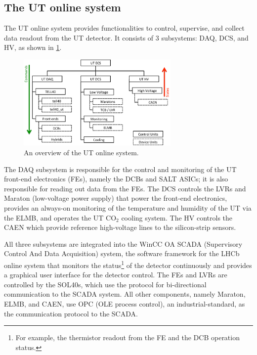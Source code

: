 \subsection{The UT online system}
\label{online-ut}


The UT online system provides functionalities to control, supervise,
and collect data readout from the UT detector.
It consists of 3 subsystems: DAQ, DCS, and HV, as shown in
\cref{fig:ut-online-system}.

\begin{figure}[!htb]
    \centering
    \includegraphics[width=0.7\textwidth]{figs-ut-upgrade/online/ut_online_sys.pdf}
    \caption{
        An overview of the UT online system.
    }
    \label{fig:ut-online-system}
\end{figure}

The DAQ subsystem is responsible for the control and monitoring of the UT
front-end electronics (FEs),
namely the DCBs and SALT ASICs;
it is also responsible for reading out data from the FEs.
The DCS controls the LVRs and Maraton (low-voltage power supply) that power the
front-end electronics,
provides an always-on monitoring of the temperature and humidity of the UT via
the ELMB,
and operates the UT $\text{CO}_2$ cooling system.
The HV controls the CAEN which provide reference high-voltage lines to the
silicon-strip sensors.

All three subsystems are integrated into the WinCC OA SCADA
(Supervisory Control And Data Acquisition) system,
the software framework for the LHCb online system that monitors the
status\footnote{
    For example, the thermistor readout from the FE and the DCB operation
    status.
} of the detector continuously and provides a graphical user interface for the
detector control.
The FEs and LVRs are controlled by the SOL40s,
which use the \dim protocol for bi-directional communication to the SCADA
system.
All other components, namely Maraton, ELMB, and CAEN,
use OPC (OLE process control),
an industrial-standard, as the communication protocol to the SCADA.

